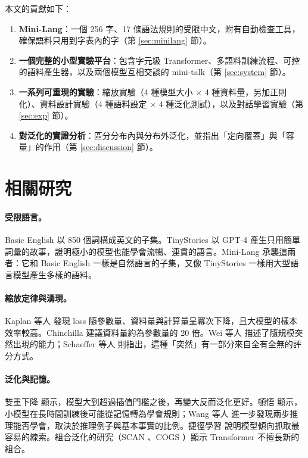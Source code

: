 \documentclass[11pt,a4paper]{article}
\begin{document}
本文的貢獻如下：
\begin{enumerate}
  \item \textbf{Mini-Lang}：一個 256 字、17 條語法規則的受限中文，附有自動檢查工具，確保語料只用到字表內的字（第 \ref{sec:minilang} 節）。
  \item \textbf{一個完整的小型實驗平台}：包含字元級 Transformer、多語料訓練流程、可控的語料產生器，以及兩個模型互相交談的 mini-talk（第 \ref{sec:system} 節）。
  \item \textbf{一系列可重現的實驗}：縮放實驗（4 種模型大小 $\times$ 4 種資料量，另加正則化）、資料設計實驗（4 種語料設定 $\times$ 4 種泛化測試），以及對話學習實驗（第 \ref{sec:exp} 節）。
  \item \textbf{對泛化的實證分析}：區分分布內與分布外泛化，並指出「定向覆蓋」與「容量」的作用（第 \ref{sec:discussion} 節）。
\end{enumerate}

\section{相關研究}

\paragraph{受限語言。}
Basic English \cite{ogden1930basic} 以 850 個詞構成英文的子集。TinyStories \cite{eldan2023tinystories} 以 GPT-4 產生只用簡單詞彙的故事，證明極小的模型也能學會流暢、連貫的語言。Mini-Lang 承襲這兩者：它和 Basic English 一樣是自然語言的子集，又像 TinyStories 一樣用大型語言模型產生多樣的語料。

\paragraph{縮放定律與湧現。}
Kaplan 等人 \cite{kaplan2020scaling} 發現 loss 隨參數量、資料量與計算量呈冪次下降，且大模型的樣本效率較高。Chinchilla \cite{hoffmann2022chinchilla} 建議資料量約為參數量的 20 倍。Wei 等人 \cite{wei2022emergent} 描述了隨規模突然出現的能力；Schaeffer 等人 \cite{schaeffer2023mirage} 則指出，這種「突然」有一部分來自全有全無的評分方式。

\paragraph{泛化與記憶。}
雙重下降 \cite{belkin2019reconciling,nakkiran2019double} 顯示，模型大到超過插值門檻之後，再變大反而泛化更好。頓悟 \cite{power2022grokking} 顯示，小模型在長時間訓練後可能從記憶轉為學會規則；Wang 等人 \cite{wang2024grokked} 進一步發現兩步推理能否學會，取決於推理例子與基本事實的比例。捷徑學習 \cite{geirhos2020shortcut} 說明模型傾向抓取最容易的線索。組合泛化的研究（SCAN \cite{lake2018generalization}、COGS \cite{kim2020cogs}）顯示 Transformer 不擅長新的組合。
\end{document}
